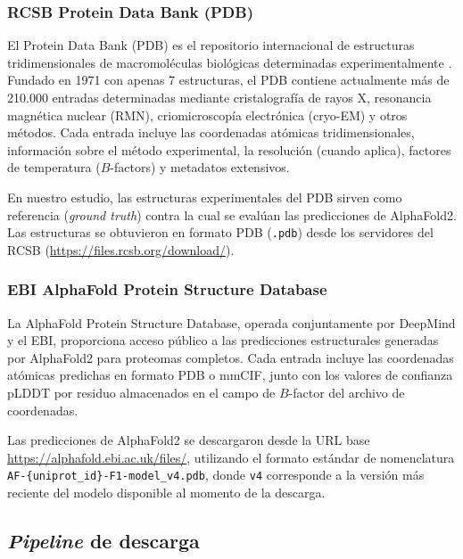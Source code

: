 \subsubsection{RCSB Protein Data Bank (PDB)}
\label{subsubsec:pdb}

El Protein Data Bank (PDB) es el repositorio internacional de estructuras tridimensionales de macromol\'eculas biol\'ogicas determinadas experimentalmente \citep{berman2000protein}. Fundado en 1971 con apenas 7 estructuras, el PDB contiene actualmente m\'as de 210.000 entradas determinadas mediante cristalograf\'ia de rayos X, resonancia magn\'etica nuclear (RMN), criomicroscop\'ia electr\'onica (cryo-EM) y otros m\'etodos. Cada entrada incluye las coordenadas at\'omicas tridimensionales, informaci\'on sobre el m\'etodo experimental, la resoluci\'on (cuando aplica), factores de temperatura ($B$-factors) y metadatos extensivos.

En nuestro estudio, las estructuras experimentales del PDB sirven como referencia (\textit{ground truth}) contra la cual se eval\'uan las predicciones de AlphaFold2. Las estructuras se obtuvieron en formato PDB (\texttt{.pdb}) desde los servidores del RCSB (\url{https://files.rcsb.org/download/}).

\subsubsection{EBI AlphaFold Protein Structure Database}
\label{subsubsec:alphafold_db}

La AlphaFold Protein Structure Database, operada conjuntamente por DeepMind y el EBI, proporciona acceso p\'ublico a las predicciones estructurales generadas por AlphaFold2 para proteomas completos. Cada entrada incluye las coordenadas at\'omicas predichas en formato PDB o mmCIF, junto con los valores de confianza pLDDT por residuo almacenados en el campo de $B$-factor del archivo de coordenadas.

Las predicciones de AlphaFold2 se descargaron desde la URL base \url{https://alphafold.ebi.ac.uk/files/}, utilizando el formato est\'andar de nomenclatura \texttt{AF-\{uniprot\_id\}-F1-model\_v4.pdb}, donde \texttt{v4} corresponde a la versi\'on m\'as reciente del modelo disponible al momento de la descarga.

\subsection{\textit{Pipeline} de descarga}
\label{subsec:pipeline_descarga}

